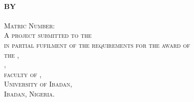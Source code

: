 \begin{titlepage}
    \begin{center}
        \textsc{\Large \Title}\\[4em]

        \textbf{BY}\\[4em]

        \textsc{\Large \Author}\\[2em]
        \textsc{Matric Number: \MatricNumber}\\[6em]


        \textsc{A project submitted to the \Department\\ in partial fufilment of the requirements for the award of\\ the \Degree,\\ \Department,\\faculty of \Faculty,\\
            University of Ibadan,\\Ibadan, Nigeria.}\\[4em]






    \end{center}



\end{titlepage}